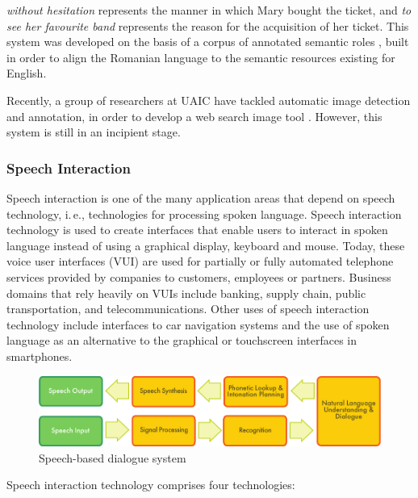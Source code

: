 \begin{multicols}{2}
\noindent\textit{without hesitation} represents the manner in which Mary bought the ticket, and \textit{to see her favourite band} represents  the reason for the acquisition of her ticket. This system was developed on the basis of a corpus of annotated semantic roles \cite{trandabat}, built in order to align the Romanian language to the semantic resources existing for English.

Recently, a group of researchers at UAIC have tackled automatic image detection and annotation, in order to develop a web search image tool \cite{iftene}. However, this system is still in an incipient stage.

\subsubsection{Speech Interaction}

Speech interaction is one of the many application areas that depend on speech technology, i.\,e., technologies for processing spoken language. Speech interaction technology is used to create interfaces that enable users to interact in spoken language instead of using a graphical display, keyboard and mouse.  Today, these voice user interfaces (VUI) are used for partially or fully automated telephone services provided by companies to customers, employees or partners. Business domains that rely heavily on VUIs include banking, supply chain, public transportation, and telecommunications. Other uses of speech interaction technology include interfaces to car navigation systems and the use of spoken language as an alternative to the graphical or touchscreen interfaces in smartphones.

\begin{figure}[htb]
  \center
  \includegraphics[width=\textwidth]{../_media/english/simple_speech-based_dialogue_architecture}
  \caption{Speech-based dialogue system}
  \label{fig:dialoguearch_en}
\end{figure}

Speech interaction technology comprises four technologies: 


\end{multicols}
